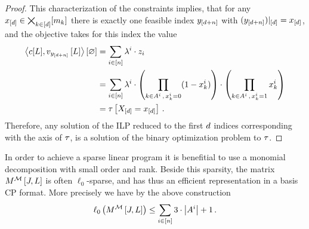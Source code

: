 \begin{proof}
    This characterization of the constraints implies, that for any $x_{[d]}\in\bigtimes_{k\in[d]}[m_{k}]$ there is exactly one feasible index $y_{[d+n]}$ with ${(y_{[d+n]})}|_{[d]}=x_{[d]}$, and the objective takes for this index the value
    \begin{align*}
        \left\langle c[L], v_{y_{[d+n]}}\left[L\right]\right\rangle \left[ \varnothing \right]
        &= \sum_{i\in[n]} \lambda^{i} \cdot z_{i} \\
        &= \sum_{i\in[n]} \lambda^{i} \cdot \left( \prod_{k\in A^{i} \, , \,  x_{k}^i = 0} (1 - x_{k}^i) \right)
        \cdot \left( \prod_{k\in A^{i} \, , \,  x_{k}^i = 1}  x_{k}^i \right)  \\
        & = \tau\left[X_{[d]}=x_{[d]}\right] \, .
    \end{align*}
    Therefore, any solution of the ILP reduced to the first $d$ indices corresponding with the axis of $\tau$, is a solution of the binary optimization problem to $\tau$.
\end{proof}


In order to achieve a sparse linear program it is benefitial to use a monomial decomposition with small order and rank.
Beside this sparsity, the matrix $M^{\mathcal{M}}\left[J,L\right]$ is often $\ell_0$-sparse, and has thus an efficient representation in a basis CP format.
More precisely we have by the above construction
\begin{align*}
    \ell_0\left(M^{\mathcal{M}}\left[J,L\right]\right) \leq \sum_{i\in[n]} 3 \cdot \left|A^{i}\right| +1 \, .
\end{align*}
